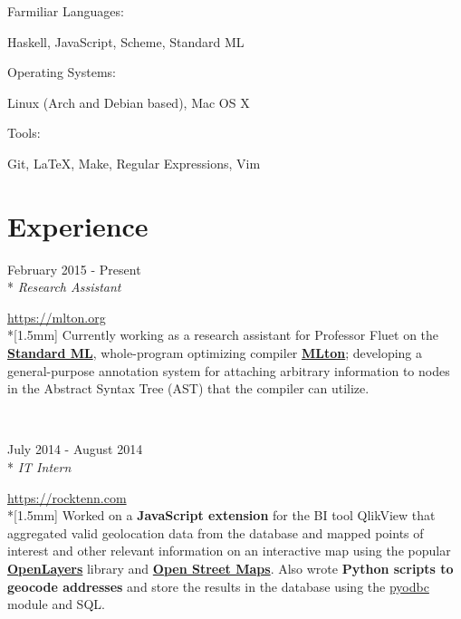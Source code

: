 \documentclass[a4paper,margin,line]{resume}
\newcommand{\rvspace}{1.5mm} %
\newcommand{\rurl}[1]{\hfill {\footnotesize \url{#1}}}
\newcommand{\rdate}[1]{\hfill {\small #1}}
\newcommand{\rdescription}[1]{\small #1 \normalsize}
\newcommand{\ritem}[5] {
    \item[#1]                               %
    \hfill \rdate{#2} \\*                   %
    \hfill {\small \emph{#3}}               %
    \strut \hfill \rurl{#4} \\*[\rvspace]    %
    \rdescription{#5}                       %
}
\newcommand{\remployer}{\ritem}
\begin{document}
\begin{resume}
\begin{compactdesc}
        \item[Farmiliar Languages:]
        \begin{asparablank} {\small
            \item Haskell, JavaScript, Scheme, Standard ML
        } \end{asparablank}

        \item[Operating Systems:]
        \begin{asparablank} {\small
            \item Linux (Arch and Debian based), Mac OS X
        } \end{asparablank}

		\item[Tools:]
        \begin{asparablank} { \small
            \item Git, \LaTeX, Make, Regular Expressions, Vim
		} \end{asparablank}
	\end{compactdesc}

\section{\mysidestyle Experience}
	\begin{asparadesc}
        \remployer {Rochester Institute of Technology}
                   {February 2015 - Present}
                   {Research Assistant}
                   {https://mlton.org}
        {
            Currently working as a research assistant for Professor Fluet on the
            \href{https://en.wikipedia.org/wiki/Standard_ML}{\bf Standard ML},
            whole-program optimizing compiler \href{https://mlton.org}{\bf MLton};
            developing a general-purpose annotation system for attaching arbitrary
            information to nodes in the Abstract Syntax Tree (AST) that the compiler
            can utilize.
        }
        \\

        \remployer {RockTenn}
                   {July 2014 - August 2014}
                   {IT Intern}
                   {https://rocktenn.com}
        {
            Worked on a {\bf JavaScript extension} for the BI tool QlikView
            that aggregated valid geolocation data from the database and mapped
            points of interest and other relevant information on an interactive
            map using the popular \href{https://openlayers.org}{\bf OpenLayers}
            library and \href{https://openstreetmap.org}{\bf Open Street Maps}.
            Also wrote {\bf Python scripts to geocode addresses} and store
            the results in the database using the
            \href{https://code.google.com/p/pyodbc/}{pyodbc} module and SQL.
	    }
    \end{asparadesc}


\end{resume}
\end{document}
